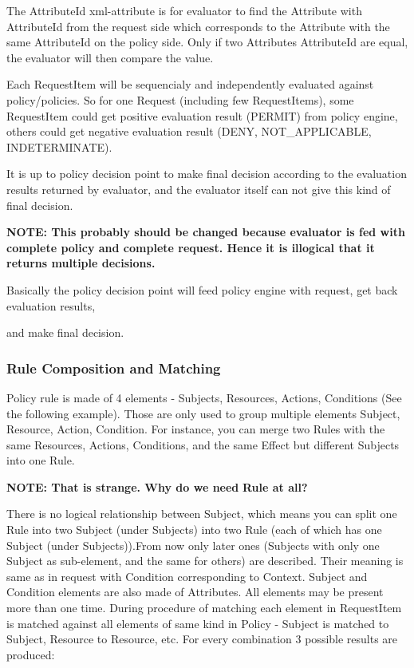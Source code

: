 \documentclass{article}
\begin{document}
{\color{black}
The {\textquotedbl}AttributeId{\textquotedbl} xml-attribute is for
evaluator to find the Attribute with AttributeId from the request side
which corresponds to the Attribute with the same AttributeId on the
policy side. Only if two Attributes{\textquotesingle} AttributeId are
equal, the evaluator will then compare the value.}

{\color{black}
Each RequestItem will be sequencialy and independently evaluated against
policy/policies. So for one Request (including few RequestItems), some
RequestItem could get positive evaluation result (PERMIT) from policy
engine, others could get negative evaluation result (DENY,
NOT\_APPLICABLE, INDETERMINATE).}

{\color{black}
It is up to policy decision point to make final decision according to
the evaluation results returned by evaluator, and the evaluator itself
can not give this kind of final decision.}

{\upshape\color{black}
\textbf{NOTE: This probably should be changed because evaluator is fed
with complete policy and complete request. Hence it is illogical that
it retu}\textbf{rns multiple decisions.}}

{\color{black}
Basically the policy decision point will feed policy engine with
request, get back evaluation results, }

{\color{black}
and make final decision.}


\bigskip

\subsubsection{Rule Composition and Matching}
{\upshape\color{black}
Policy rule is made of 4 elements - Subjects, Resources, Actions,
Conditions (See the following example). Those are only used to group
multiple elements Subject, Resource, Action, Condition. For instance,
you can merge two Rules with the same Resources, Actions, Conditions,
and the same {\textquotedbl}Effect{\textquotedbl} but different
Subjects into one Rule.}

{\upshape\color{black}
\textbf{NOTE: That is strange. Why do we need }\textbf{Rule at all?}}

{\upshape\color{black}
There is no logical relationship between Subject, which means you can
split one Rule into two Subject (under Subjects) into two Rule (each of
which has one Subject (under Subjects)).From now only later ones
(Subjects with only one Subject as sub-element, and the same for
others) are described. Their meaning is same as in request with
Condition corresponding to Context. Subject and Condition elements are
also made of Attributes. All elements may be present more than one
time. During procedure of matching each element in RequestItem is
matched against all elements of same kind in Policy - Subject is
matched to Subject, Resource to Resource, etc. For every combination 3
possible results are produced:}
\end{document}
